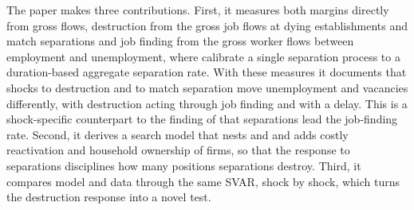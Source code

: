 \documentclass[authoryear, review, 12pt]{elsarticle}
\begin{document}
The paper makes three contributions. First, it measures both margins directly from gross flows, destruction from the gross job flows at dying establishments and match separations and job finding from the gross worker flows between employment and unemployment, where \citet{coles_2018} calibrate a single separation process to a duration-based aggregate separation rate. With these measures it documents that shocks to destruction and to match separation move unemployment and vacancies differently, with destruction acting through job finding and with a delay. This is a shock-specific counterpart to the finding of \citet{broer_2025} that separations lead the job-finding rate. Second, it derives a search model that nests \citet{coles_2018} and \citet{gabrovski_2025} and adds costly reactivation and household ownership of firms, so that the response to separations disciplines how many positions separations destroy. Third, it compares model and data through the same SVAR, shock by shock, which turns the destruction response into a novel test.
\end{document}

